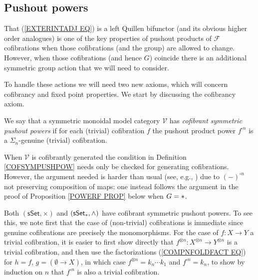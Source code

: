 \documentclass[a4paper,10pt]{article}%
\begin{document}
\subsection{Pushout powers}\label{PUSHPOW SEC}

That (\ref{EXTERINTADJ EQ}) is a left Quillen bifunctor (and its obvious higher order analogues) is one of the key properties of pushout products of $\mathcal{F}$ cofibrations when those cofibrations (and the group) are allowed to change. However, when those cofibrations (and hence $G$) coincide there is an additional symmetric group action that  we will need to consider.

To handle these actions we will need two new axioms, 
which will concern cofibrancy and fixed point properties. We start by discussing the cofibrancy axiom.


\begin{definition}\label{COFSYMPUSHPOW}
	We say that a symmetric monoidal model category $\mathcal{V}$ has 
	\textit{cofibrant symmetric pushout powers}
	if for each (trivial) cofibration $f$ the pushout product power 
	$f^{\square n}$ is a $\Sigma_n$-genuine 
	(trivial) cofibration.
\end{definition}


\begin{remark}
When $\mathcal{V}$ is cofibrantly generated
the condition in Definition \ref{COFSYMPUSHPOW} needs only be checked for generating cofibrations. 
However, the argument needed is harder than usual
(see, e.g., \cite[Lemma 2.1.20]{Ho98}) due to $(-)^{\square n}$ not preserving composition of maps:
one instead follows the argument in the proof of 
Proposition \ref{POWERF PROP} below when $G=\**$.
\end{remark}



\begin{example}
	Both $(\mathsf{sSet},\times)$ and 
	$(\mathsf{sSet}_{\**},\wedge)$ have cofibrant symmetric pushout powers. To see this, we note first that the case of (non-trivial)
	cofibrations is immediate since genuine cofibrations
	are precisely the monomorphisms.
	For the case of $f \colon X \to Y$ a trivial cofibration, it is easier to first show directly that 
	$f^{\otimes n} \colon X^{\otimes n} \to Y^{\otimes n}$
	is a trivial cofibration, 
	and then use the factorizations
	(\ref{COMPNFOLDFACT EQ})
	for $h=f$, $g=(\emptyset \to X)$, 
	in which case $f^{\otimes n} = k_n\cdots k_1$ and 
	$f^{\square n} = k_n$,
	to show by induction on $n$ that 
	$f^{\square n}$ is also a trivial cofibration.
\end{example}
\end{document}
